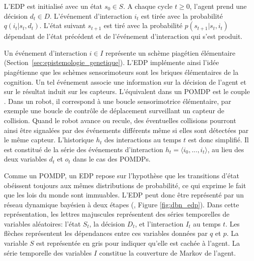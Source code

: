 L'EDP est initialisé avec un état $s_0 \in S$.
A chaque cycle $t \geq 0$, l'agent prend une décision $d_t\in D$. 
L'événement d'interaction $i_t$ est tirée avec la probabilité $q(i_t|s_t,d_t)$. 
L'état suivant $s_{t+1}$ est tiré avec la probabilité $p(s_{t+1}|s_{t},i_{t})$ dépendant de l'état précédent et de l'événement d'interaction qui s'est produit.

Un événement d'interaction $i \in I$ représente un schème piagétien élémentaire (Section~\ref{sec:epistemologie_genetique}). 
L'EDP implémente ainsi l'idée piagétienne que les schèmes sensorimoteurs sont les briques élémentaires de la cognition.
Un tel événement associe une information sur la décision de l'agent et sur le résultat induit sur les capteurs.
L'équivalent dans un POMDP est le couple .
Dans un robot, il correspond à une boucle sensorimotrice élémentaire, par exemple une boucle de contrôle de déplacement surveillant un capteur de collision.
Quand le robot avance ou recule, des éventuelles collisions pourront ainsi être signalées par des événements différents même si elles sont détectées par le même capteur.
L'historique $h_t$ des interactions au temps $t$ est donc simplifié. 
Il est constitué de la série des événements d'interaction $h_t = \langle i_0, ..., i_{t} \rangle$, au lieu des deux variables $d_t$ et $o_t$ dans le cas des POMDPs.



Comme un POMDP, un EDP repose sur l'hypothèse que les transitions d'état obéissent toujours aux mêmes distributions de probabilité, ce qui exprime le fait que les lois du monde sont immuables. 
L'EDP peut donc être représenté par un réseau dynamique bayésien à deux étapes (, Figure \ref{fig:dbn_edp}).
Dans cette représentation, les lettres majuscules représentent des séries temporelles de variables aléatoires: l'état $S_t$, la décision $D_t$, et l'interaction $I_t$ au temps $t$.  
Les flèches représentent les dépendances entre ces variables données par $q$ et $p$. 
La variable $S$ est représentée en gris pour indiquer qu'elle est cachée à l'agent. 
La série temporelle des variables $I$ constitue la couverture de Markov de l'agent.


